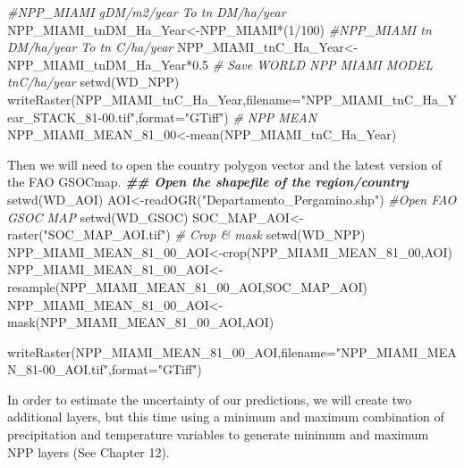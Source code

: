 \documentclass[
  10pt,
  b5paper,
]{book}
\newenvironment{Shaded}{\begin{snugshade}}{\end{snugshade}}
\newcommand{\AttributeTok}[1]{\textcolor[rgb]{0.77,0.63,0.00}{#1}}
\newcommand{\CommentTok}[1]{\textcolor[rgb]{0.56,0.35,0.01}{\textit{#1}}}
\newcommand{\DecValTok}[1]{\textcolor[rgb]{0.00,0.00,0.81}{#1}}
\newcommand{\DocumentationTok}[1]{\textcolor[rgb]{0.56,0.35,0.01}{\textbf{\textit{#1}}}}
\newcommand{\FloatTok}[1]{\textcolor[rgb]{0.00,0.00,0.81}{#1}}
\newcommand{\FunctionTok}[1]{\textcolor[rgb]{0.00,0.00,0.00}{#1}}
\newcommand{\NormalTok}[1]{#1}
\newcommand{\OtherTok}[1]{\textcolor[rgb]{0.56,0.35,0.01}{#1}}
\newcommand{\SpecialCharTok}[1]{\textcolor[rgb]{0.00,0.00,0.00}{#1}}
\newcommand{\StringTok}[1]{\textcolor[rgb]{0.31,0.60,0.02}{#1}}
\begin{document}
\begin{Shaded}
\begin{Highlighting}[]
\CommentTok{\#NPP\_MIAMI gDM/m2/year To tn DM/ha/year}
\NormalTok{NPP\_MIAMI\_tnDM\_Ha\_Year}\OtherTok{\textless{}{-}}\NormalTok{NPP\_MIAMI}\SpecialCharTok{*}\NormalTok{(}\DecValTok{1}\SpecialCharTok{/}\DecValTok{100}\NormalTok{)}
\CommentTok{\#NPP\_MIAMI tn DM/ha/year To tn C/ha/year}
\NormalTok{NPP\_MIAMI\_tnC\_Ha\_Year}\OtherTok{\textless{}{-}}\NormalTok{NPP\_MIAMI\_tnDM\_Ha\_Year}\SpecialCharTok{*}\FloatTok{0.5}
\CommentTok{\# Save WORLD NPP MIAMI MODEL tnC/ha/year}
\FunctionTok{setwd}\NormalTok{(WD\_NPP)}
\FunctionTok{writeRaster}\NormalTok{(NPP\_MIAMI\_tnC\_Ha\_Year,}\AttributeTok{filename=}\StringTok{"NPP\_MIAMI\_tnC\_Ha\_Year\_STACK\_81{-}00.tif"}\NormalTok{,}\AttributeTok{format=}\StringTok{"GTiff"}\NormalTok{)}
\CommentTok{\# NPP MEAN}
\NormalTok{NPP\_MIAMI\_MEAN\_81\_00}\OtherTok{\textless{}{-}}\FunctionTok{mean}\NormalTok{(NPP\_MIAMI\_tnC\_Ha\_Year)}

\NormalTok{Then we will need to open the country polygon vector and the latest version of the FAO GSOCmap.}
\DocumentationTok{\#\# Open the shapefile of the region/country}
\FunctionTok{setwd}\NormalTok{(WD\_AOI)}
\NormalTok{AOI}\OtherTok{\textless{}{-}}\FunctionTok{readOGR}\NormalTok{(}\StringTok{"Departamento\_Pergamino.shp"}\NormalTok{)}
\CommentTok{\#Open FAO GSOC MAP }
\FunctionTok{setwd}\NormalTok{(WD\_GSOC)}
\NormalTok{SOC\_MAP\_AOI}\OtherTok{\textless{}{-}}\FunctionTok{raster}\NormalTok{(}\StringTok{"SOC\_MAP\_AOI.tif"}\NormalTok{)}
\CommentTok{\# Crop \& mask}
\FunctionTok{setwd}\NormalTok{(WD\_NPP)}
\NormalTok{NPP\_MIAMI\_MEAN\_81\_00\_AOI}\OtherTok{\textless{}{-}}\FunctionTok{crop}\NormalTok{(NPP\_MIAMI\_MEAN\_81\_00,AOI)}
\NormalTok{NPP\_MIAMI\_MEAN\_81\_00\_AOI}\OtherTok{\textless{}{-}}\FunctionTok{resample}\NormalTok{(NPP\_MIAMI\_MEAN\_81\_00\_AOI,SOC\_MAP\_AOI)}
\NormalTok{NPP\_MIAMI\_MEAN\_81\_00\_AOI}\OtherTok{\textless{}{-}}\FunctionTok{mask}\NormalTok{(NPP\_MIAMI\_MEAN\_81\_00\_AOI,AOI)}

\FunctionTok{writeRaster}\NormalTok{(NPP\_MIAMI\_MEAN\_81\_00\_AOI,}\AttributeTok{filename=}\StringTok{"NPP\_MIAMI\_MEAN\_81{-}00\_AOI.tif"}\NormalTok{,}\AttributeTok{format=}\StringTok{"GTiff"}\NormalTok{)}
\end{Highlighting}
\end{Shaded}

In order to estimate the uncertainty of our predictions, we will create two additional layers, but this time using a minimum and maximum combination of precipitation and temperature variables to generate minimum and maximum NPP layers (See Chapter 12).
\end{document}
